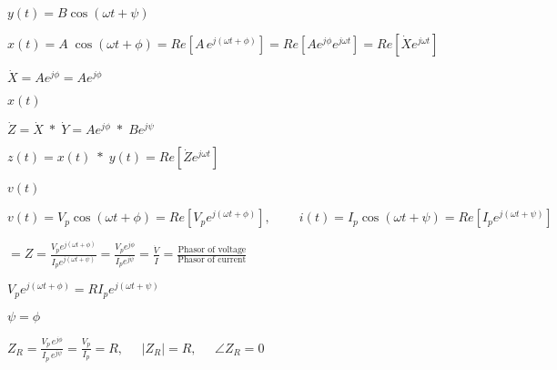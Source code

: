 \documentclass{article}
\def\lthtmlcheckvsize{\ifdim\ht\sizebox<\vsize 
  \ifdim\wd\sizebox<\hsize\expandafter\hfill\fi \expandafter\vfill
  \else\expandafter\vss\fi}%
\begin{document}
{\newpage\clearpage
{}%
$ y(t)=B\cos(\omega t+\psi)$%
\lthtmlindisplaymathZ
\lthtmlcheckvsize\clearpage}

{\newpage\clearpage
{}%
$\displaystyle x(t)=A\;\cos(\omega t+\phi)=Re[A\,e^{j(\omega t+\phi)}]
=Re[A e^{j\phi} e^{j\omega t}] =Re[\dot{X} e^{j\omega t}]$%
\lthtmlindisplaymathZ
\lthtmlcheckvsize\clearpage}

{\newpage\clearpage
{}%
$ \dot{X}=A e^{j\phi}=A e^{j\phi}$%
\lthtmlindisplaymathZ
\lthtmlcheckvsize\clearpage}

{\newpage\clearpage
{}%
$ x(t)$%
\lthtmlindisplaymathZ
\lthtmlcheckvsize\clearpage}

{\newpage\clearpage
{}%
$\displaystyle \dot{Z}=\dot{X}\;*\;\dot{Y}=A e^{j\phi} \;*\; B e^{j\psi}$%
\lthtmlindisplaymathZ
\lthtmlcheckvsize\clearpage}

{\newpage\clearpage
{}%
$\displaystyle z(t)=x(t)\;*\;y(t)=Re[\dot{Z} e^{j\omega t}]$%
\lthtmlindisplaymathZ
\lthtmlcheckvsize\clearpage}

{\newpage\clearpage
{}%
$ v(t)$%
\lthtmlindisplaymathZ
\lthtmlcheckvsize\clearpage}

{\newpage\clearpage
{}%
$\displaystyle v(t)=V_p\cos(\omega t+\phi)=Re[ V_p e^{j(\omega t+\phi)} ],
\;\;\;\;\;\;\;\;
i(t)=I_p\cos(\omega t+\psi)=Re[ I_p e^{j(\omega t+\psi)} ]$%
\lthtmlindisplaymathZ
\lthtmlcheckvsize\clearpage}

{\newpage\clearpage
{}%
$\displaystyle =Z=\frac{V_pe^{j(\omega t+\phi)}}{I_pe^{j(\omega t+\psi)}}
=\frac{V_pe^{j\phi}}{I_pe^{j\psi}}=\frac{\dot{V}}{\dot{I}}
=\frac{\mbox{Phasor of voltage}}{\mbox{Phasor of current}}$%
\lthtmlindisplaymathZ
\lthtmlcheckvsize\clearpage}

{\newpage\clearpage
{}%
$\displaystyle V_pe^{j(\omega t+\phi)}=R I_pe^{j(\omega t+\psi)}$%
\lthtmlindisplaymathZ
\lthtmlcheckvsize\clearpage}

{\newpage\clearpage
{}%
$ \psi=\phi$%
\lthtmlindisplaymathZ
\lthtmlcheckvsize\clearpage}

{\newpage\clearpage
{}%
$\displaystyle Z_R=\frac{V_p\,e^{j\phi}}{I_p\,e^{j\psi}}
=\frac{V_p}{I_p}=R, \;\;\;\;\; |Z_R|=R,\;\;\;\;\;\angle Z_R=0$%
\lthtmlindisplaymathZ
\lthtmlcheckvsize\clearpage}
\end{document}
